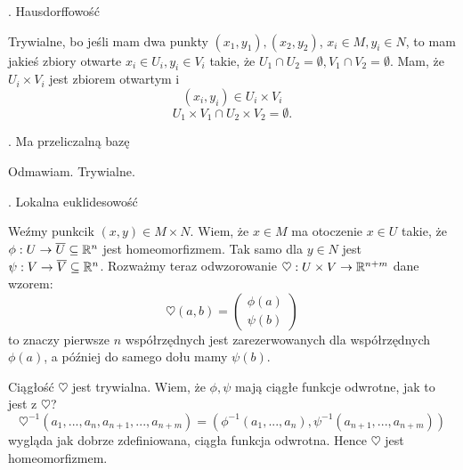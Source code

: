\documentclass{article}
\begin{document}
. Hausdorffowość

Trywialne, bo jeśli mam dwa punkty $(x_1,y_1), (x_2,y_2)$, $x_i\in M,y_i\in N$, to mam jakieś zbiory otwarte $x_i\in U_i,y_i\in V_i$ takie, że $U_1\cap U_2=\emptyset,V_1\cap V_2=\emptyset$. Mam, że $U_i\times V_i$ jest zbiorem otwartym i
$$(x_i,y_i)\in U_i\times V_i$$
$$U_1\times V_1\cap U_2\times V_2=\emptyset.$$

. Ma przeliczalną bazę

Odmawiam. Trywialne.

. Lokalna euklidesowość

Weźmy punkcik $(x,y)\in M\times N$. Wiem, że $x\in M$ ma otoczenie $x\in U$ takie, że $\phi:U\to \overline U\subseteq \mathbb{R}^n$ jest homeomorfizmem. Tak samo dla $y\in N$ jest $\psi:V\to \overline V\subseteq \mathbb{R}^n$. Rozważmy teraz odwzorowanie $\heartsuit:U\times V\to \mathbb{R}^{n+m}$ dane wzorem:
$$\heartsuit(a, b)=\begin{pmatrix}
    \phi(a)\\
    \psi(b)
\end{pmatrix}$$
to znaczy pierwsze $n$ współrzędnych jest zarezerwowanych dla współrzędnych $\phi(a)$, a później do samego dołu mamy $\psi(b)$.

Ciągłość $\heartsuit$ jest trywialna. Wiem, że $\phi,\psi$ mają ciągłe funkcje odwrotne, jak to jest z $\heartsuit$?
$$\heartsuit^{-1}(a_1,...,a_n,a_{n+1},...,a_{n+m})=(\phi^{-1}(a_1,...,a_n), \psi^{-1}(a_{n+1},...,a_{n+m}))$$
wygląda jak dobrze zdefiniowana, ciągła funkcja odwrotna. Hence $\heartsuit$ jest homeomorfizmem.
\end{document}
